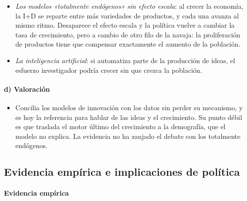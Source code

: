 \documentclass[11pt]{article}
\begin{document}
\begin{itemize}
\item \emph{Los modelos «totalmente endógenos» sin efecto escala}\nocite{Young1998Growth,Peretto1998Technological}: al crecer la economía, la I+D se reparte entre más variedades de productos, y cada una avanza al mismo ritmo. Desaparece el efecto escala y la política vuelve a cambiar la tasa de crecimiento, pero a cambio de otro filo de la navaja: la proliferación de productos tiene que compensar exactamente el aumento de la población.
\item \emph{La inteligencia artificial}: si automatiza parte de la producción de ideas, el esfuerzo investigador podría crecer sin que crezca la población\nocite{AghionJonesJones2019Artificial}.
\end{itemize}

\paragraph{d) Valoración}

\begin{itemize}
\item Concilia los modelos de innovación con los datos sin perder su mecanismo, y es hoy la referencia para hablar de las ideas y el crecimiento\nocite{Jones2005Growth,Jones2022}. Su punto débil es que traslada el motor último del crecimiento a la demografía, que el modelo no explica. La evidencia no ha zanjado el debate con los totalmente endógenos.
\end{itemize}

\subsection{Evidencia empírica e implicaciones de política}\label{sec:evidencia-politica}

\paragraph{Evidencia empírica}
\end{document}
